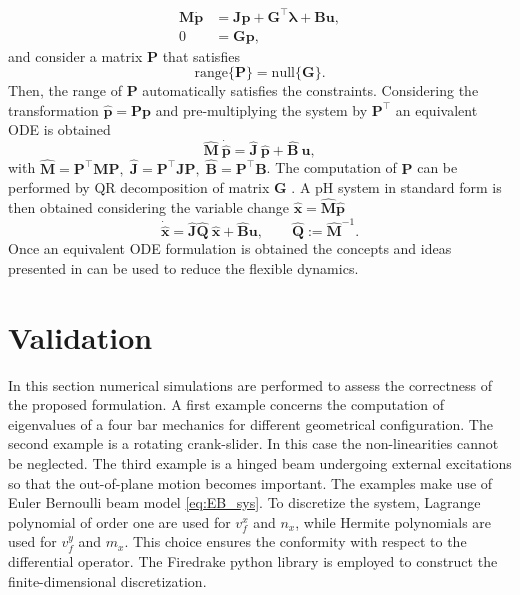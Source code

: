 \documentclass{svjour3}                     %
\begin{document}
\begin{equation}
\begin{aligned}
\mathbf{M} \dot{\mathbf{p}} &=  \mathbf{J}\mathbf{p} + \mathbf{G}^\top \bm{\lambda} + \mathbf{B}\mathbf{u}, \\ 
0 &= \mathbf{G}\mathbf{p},
\end{aligned}
\end{equation}
and consider a matrix $\mathbf{P}$ that satisfies 
\[
\mathrm{range}\{\mathbf{P}\} = \mathrm{null}\{\mathbf{G}\}.
\]
Then, the range of $\mathbf{P}$ automatically satisfies the constraints. Considering the transformation $\widehat{\mathbf{p}} = \mathbf{P} \mathbf{p}$ and pre-multiplying the system by $\mathbf{P}^\top$ an equivalent ODE is obtained
\[
\widehat{\mathbf{M}} \ \dot{\widehat{\mathbf{p}}} =  \widehat{\mathbf{J}} \ \widehat{\mathbf{p}} + \widehat{\mathbf{B}} \ \mathbf{u},
\]
with $\widehat{\mathbf{M}} = \mathbf{P}^\top \mathbf{M} \mathbf{P}, \; \widehat{\mathbf{J}} = \mathbf{P}^\top \mathbf{J} \mathbf{P}, \; \widehat{\mathbf{B}} = \mathbf{P}^\top \mathbf{B}$. The computation of $\mathbf{P}$ can be performed by QR decomposition of matrix $\mathbf{G}$ \cite{nullspaceFlMult}. A pH system in standard form is then obtained considering the variable change $\widehat{\mathbf{x}} = \widehat{\mathbf{M}} \widehat{\mathbf{p}}$
\[ \dot{\widehat{\mathbf{x}}} =  \widehat{\mathbf{J}} \widehat{\mathbf{Q}}\ \widehat{\mathbf{x}} + \widehat{\mathbf{B}}  \mathbf{u}, \qquad \widehat{\mathbf{Q}}:= \widehat{\mathbf{M}}^{-1}.
\] 
Once an equivalent ODE formulation is obtained the concepts and ideas presented in \cite{phode_red} can be used to reduce the flexible dynamics.

\section{Validation}
\label{sec:valid}

In this section numerical simulations are performed to assess the correctness of the proposed formulation. A first example concerns the computation of eigenvalues of a four bar mechanics for different geometrical configuration. The second example is a rotating crank-slider. In this case the non-linearities cannot be neglected. The third example is a hinged beam undergoing external excitations so that the out-of-plane motion becomes important. The examples make use of Euler Bernoulli beam model \eqref{eq:EB_sys}. To discretize the system, Lagrange polynomial of order one are used for $v_f^x$ and $n_x$, while Hermite polynomials are used for $v_f^y$ and $m_{x}$. This choice ensures the conformity with respect to the differential operator. The Firedrake python library \cite{rathgeber2017firedrake} is employed to construct the finite-dimensional discretization.  
\end{document}
